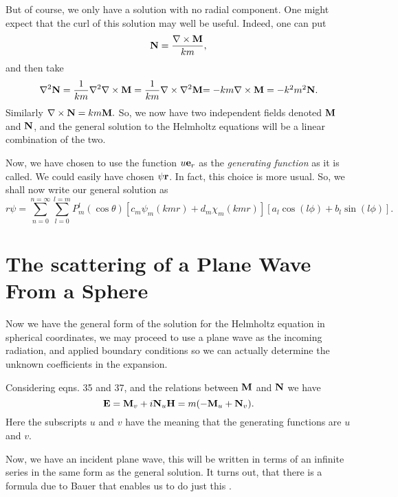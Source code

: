 \documentclass[12pt]{article}
\begin{document}
But of course, we only have a solution with no radial component.
One might expect that the curl of this solution may well be useful.
Indeed, one can put
\begin{equation}
{\bf N}=\frac{\nabla \times {\bf M}}{k m},
\end{equation}
and then take
\begin{equation}
\nabla^2 {\bf N}=\frac{1}{k m} \nabla^2 \nabla \times {\bf M}
= \frac{1}{k m} \nabla \times \nabla^2 {\bf M}
$$     $$
=-k m \nabla \times {\bf M}=-k^2 m^2 {\bf N}.
\end{equation}
Similarly $\nabla \times {\bf N} = k m {\bf M}.$
So, we now have two independent fields denoted ${\bf M}$ and ${\bf N}$, and
the general solution to the Helmholtz equations will be a linear combination of the two.

Now, we have chosen to use the function $u {\bf e}_r$ as the {\it generating function} as it is called. We could easily have chosen $\psi {\bf r}$. In fact, this choice is more usual. So, we shall now write our general solution as
\begin{equation}
r \psi =\sum_{n=0}^{n=\infty}
\sum_{l=0}^{l=m}
P_m^l(\cos \theta) [ c_m \psi_m(kmr)+d_m \chi_m(kmr) ] 
[a_l \cos (l \phi) +b_l \sin(l \phi)].
\end{equation}

\section{The scattering of a Plane Wave From a Sphere}

Now we have the general form of the solution for the Helmholtz equation in spherical coordinates, we may proceed to use a plane wave as the incoming radiation, and applied boundary conditions so we can actually determine the unknown coefficients in the expansion.

Considering eqns. 35 and 37, and the relations between ${\bf M}$ and ${\bf N}$
 we have
\begin{equation}
{\bf E}={\bf M}_v + i {\bf N}_u
$$       $$ 
{\bf H}= m ( -{\bf M}_u+{\bf N}_v).
\end{equation}
Here the subscripts $u$ and $v$ have the meaning that the generating functions
are $u$ and $v$.

Now,  we have an incident plane wave, this will be written in terms of an infinite series in the same form as the general solution. It turns out, that there is a formula due to Bauer that enables us to do just this \cite{Watson:Miebib}.
\end{document}
